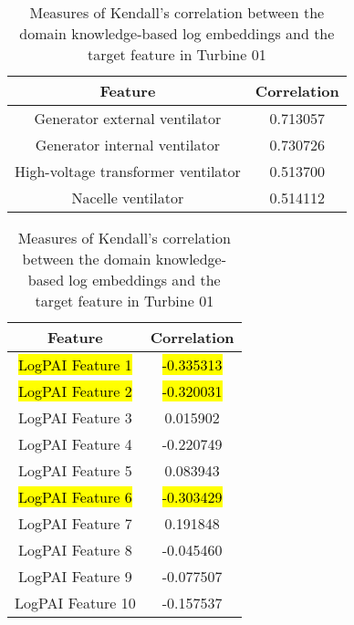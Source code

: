 \begin{table}[H]
    \parbox{.45\linewidth}{
    \centering
    \begin{tabular}{|c|c|}
        \hline
        Feature & Correlation\\
        \hline
        \multicolumn{1}{|m{0.25\textwidth}|}{Generator external ventilator} & 0.713057\\
        \hline
        \multicolumn{1}{|m{0.25\textwidth}|}{Generator internal ventilator} & 0.730726\\
        \hline
        \multicolumn{1}{|m{0.25\textwidth}|}{High-voltage transformer ventilator} & 0.513700\\
        \hline
        \multicolumn{1}{|m{0.25\textwidth}|}{Nacelle ventilator} & 0.514112\\
        \hline
    \end{tabular}
    \caption{Measures of Kendall's correlation between the domain knowledge-based log embeddings and the target feature in Turbine 01}
    \label{tab:expII:domain-knowledge-feats}
    }
    \hfill
    \parbox{.45\linewidth}{
    \centering
    \begin{tabular}{|c|c|}
        \hline
        Feature & Correlation\\
        \hline
        \multicolumn{1}{|m{0.25\textwidth}|}{\hl{LogPAI Feature 1}} & \hl{-0.335313}\\
        \hline
        \multicolumn{1}{|m{0.25\textwidth}|}{\hl{LogPAI Feature 2}} & \hl{-0.320031}\\
        \hline
        \multicolumn{1}{|m{0.25\textwidth}|}{LogPAI Feature 3} & 0.015902\\
        \hline
        \multicolumn{1}{|m{0.25\textwidth}|}{LogPAI Feature 4} & -0.220749\\
        \hline
        \multicolumn{1}{|m{0.25\textwidth}|}{LogPAI Feature 5} & 0.083943\\
        \hline
        \multicolumn{1}{|m{0.25\textwidth}|}{\hl{LogPAI Feature 6}} & \hl{-0.303429}\\
        \hline
        \multicolumn{1}{|m{0.25\textwidth}|}{LogPAI Feature 7} & 0.191848\\
        \hline
        \multicolumn{1}{|m{0.25\textwidth}|}{LogPAI Feature 8} & -0.045460\\
        \hline
        \multicolumn{1}{|m{0.25\textwidth}|}{LogPAI Feature 9} & -0.077507\\
        \hline
        \multicolumn{1}{|m{0.25\textwidth}|}{LogPAI Feature 10} & -0.157537\\

\end{tabular}}
\end{table}
